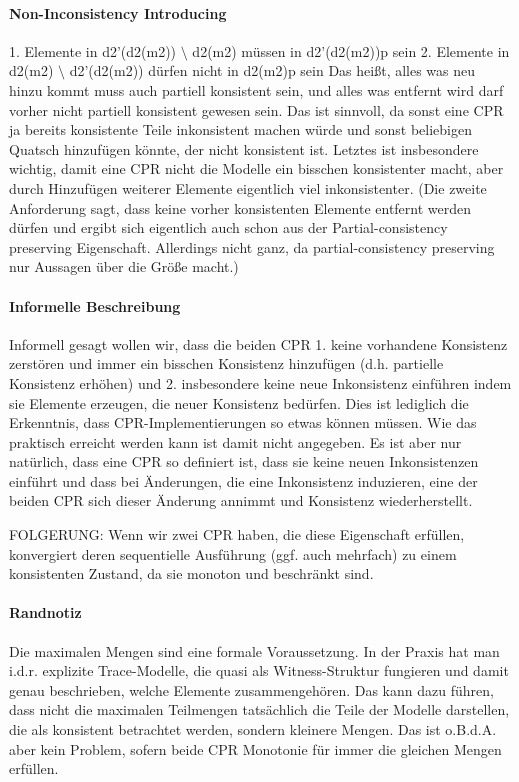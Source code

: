 \paragraph{Non-Inconsistency Introducing}
1. Elemente in d2'(d2(m2)) $\setminus$ d2(m2) müssen in d2'(d2(m2))p sein
2. Elemente in d2(m2) $\setminus$ d2'(d2(m2)) dürfen nicht in d2(m2)p sein
Das heißt, alles was neu hinzu kommt muss auch partiell konsistent sein, und alles was entfernt wird darf vorher nicht partiell konsistent gewesen sein.
Das ist sinnvoll, da sonst eine CPR ja bereits konsistente Teile inkonsistent machen würde und sonst beliebigen Quatsch hinzufügen könnte, der nicht konsistent ist. Letztes ist insbesondere wichtig, damit eine CPR nicht die Modelle ein bisschen konsistenter macht, aber durch Hinzufügen weiterer Elemente eigentlich viel inkonsistenter.
(Die zweite Anforderung sagt, dass keine vorher konsistenten Elemente entfernt werden dürfen und ergibt sich eigentlich auch schon aus der Partial-consistency preserving Eigenschaft. Allerdings nicht ganz, da partial-consistency preserving nur Aussagen über die Größe macht.)

\paragraph{Informelle Beschreibung}
Informell gesagt wollen wir, dass die beiden CPR 1. keine vorhandene Konsistenz zerstören und immer ein bisschen Konsistenz hinzufügen (d.h. partielle Konsistenz erhöhen) und 2. insbesondere keine neue Inkonsistenz einführen indem sie Elemente erzeugen, die neuer Konsistenz bedürfen.
Dies ist lediglich die Erkenntnis, dass CPR-Implementierungen so etwas können müssen. Wie das praktisch erreicht werden kann ist damit nicht angegeben.
Es ist aber nur natürlich, dass eine CPR so definiert ist, dass sie keine neuen Inkonsistenzen einführt und dass bei Änderungen, die eine Inkonsistenz induzieren, eine der beiden CPR sich dieser Änderung annimmt und Konsistenz wiederherstellt.

FOLGERUNG:
Wenn wir zwei CPR haben, die diese Eigenschaft erfüllen, konvergiert deren sequentielle Ausführung (ggf. auch mehrfach) zu einem konsistenten Zustand, da sie monoton und beschränkt sind.

\paragraph{Randnotiz}
Die maximalen Mengen sind eine formale Voraussetzung. In der Praxis hat man i.d.r. explizite Trace-Modelle, die quasi als Witness-Struktur fungieren und damit genau beschrieben, welche Elemente zusammengehören. Das kann dazu führen, dass nicht die maximalen Teilmengen tatsächlich die Teile der Modelle darstellen, die als konsistent betrachtet werden, sondern kleinere Mengen.
Das ist o.B.d.A. aber kein Problem, sofern beide CPR Monotonie für immer die gleichen Mengen erfüllen.

